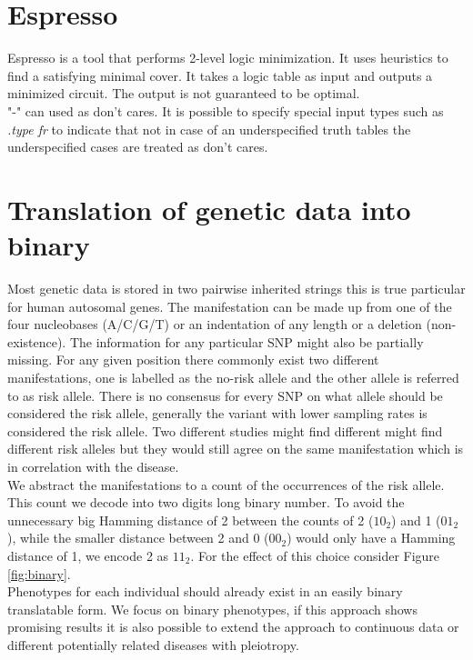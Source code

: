 \documentclass[letterpaper, 11pt]{article}
\begin{document}
\section{Espresso}
Espresso is a tool that performs 2-level logic minimization. It uses heuristics to find a satisfying minimal cover. It takes a logic table as input and outputs a minimized circuit.  The output is not guaranteed to be optimal. \\

"-" can used as don't cares. It is possible to specify special input types such as  \emph{.type fr} to indicate that not in case of an underspecified truth tables the underspecified cases are treated as don't cares. 


\section{Translation of genetic data into binary}
\label{sec:encode}
Most genetic data is stored in two pairwise inherited strings this is true particular for human autosomal genes. The manifestation can be made up from one of the four nucleobases (A/C/G/T) or an indentation of any length or a deletion (non-existence). The information for any particular SNP might also be partially missing. For any given position there commonly exist two different manifestations, one is labelled as the no-risk allele and the other allele is referred to as risk allele. There is no consensus for every SNP on what allele should be considered the risk allele, generally the variant with lower sampling rates is considered the risk allele. Two different studies might find different might find different risk alleles but they would still agree on the same manifestation which is in correlation with the disease. \\


We abstract the manifestations to a count of the occurrences of the risk allele. This count we decode into two digits long binary number. To avoid the unnecessary big Hamming distance of 2 between the counts of 2 ($10_2$) and 1 ($01_2$), while the smaller distance between 2 and 0 ($00_2$) would only have a Hamming distance of 1, we encode 2 as $11_2$. For the effect of this choice consider Figure \ref{fig:binary}.\\

Phenotypes for each individual should already exist in an easily binary translatable form.  We focus on binary phenotypes, if this approach shows promising results it is also possible to extend the approach to continuous  data or different potentially related diseases with pleiotropy. 
\end{document}
